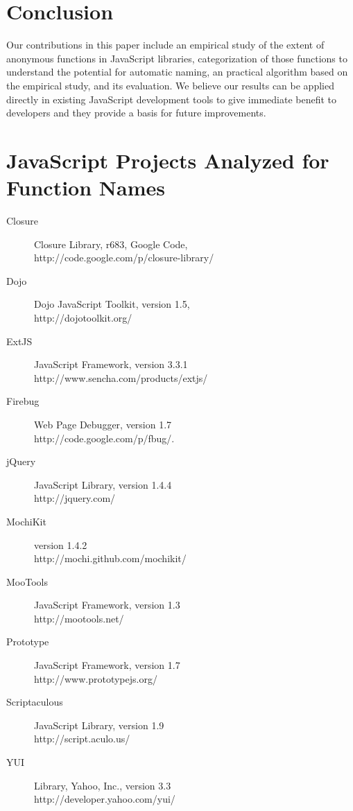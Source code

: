 \documentclass[10pt, preprint]{sigplanconf}
\begin{document}
\section{Conclusion}
Our contributions in this paper include an empirical study of the extent of anonymous functions in JavaScript libraries, categorization of those functions to understand the potential for automatic naming, an practical algorithm based on the empirical study, and its evaluation.   We believe our results can be applied directly in existing JavaScript development tools to give immediate benefit to developers and they provide a basis for future improvements.



\appendix
\section{JavaScript Projects Analyzed for Function Names}
\begin{description}
\item[Closure] Closure Library, r683, Google Code, \\
http://code.google.com/p/closure-library/
\item[Dojo] Dojo JavaScript Toolkit, version 1.5, \\
http://dojotoolkit.org/
\item[ExtJS] JavaScript Framework, version 3.3.1 \\
http://www.sencha.com/products/extjs/
\item[Firebug] Web Page Debugger, version 1.7 \\
 http://code.google.com/p/fbug/.
\item[jQuery] JavaScript Library, version 1.4.4\\
http://jquery.com/
\item[MochiKit] version 1.4.2 \\
http://mochi.github.com/mochikit/
\item[MooTools] JavaScript Framework, version 1.3 \\
http://mootools.net/
\item[Prototype] JavaScript Framework, version 1.7 \\
http://www.prototypejs.org/
\item[Scriptaculous] JavaScript Library, version 1.9 \\
http://script.aculo.us/
\item[YUI] Library, Yahoo, Inc., version 3.3 \\
http://developer.yahoo.com/yui/
\end{description}
\end{document}
